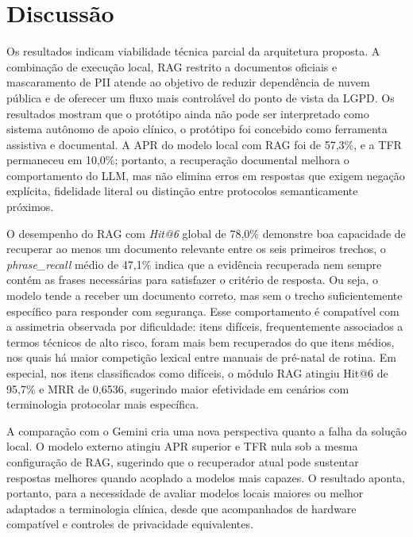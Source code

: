 \documentclass[12pt]{article}
\begin{document}
\section{Discussão}
Os resultados indicam viabilidade técnica parcial da arquitetura proposta.
A combinação de execução local, RAG restrito a documentos oficiais e mascaramento de PII atende ao objetivo de reduzir dependência de nuvem pública e de oferecer um fluxo mais controlável do ponto de vista da LGPD.
Os resultados mostram que o protótipo ainda não pode ser interpretado como sistema autônomo de apoio clínico, o protótipo foi concebido como ferramenta assistiva e documental.
A APR do modelo local com RAG foi de 57,3\%, e a TFR permaneceu em 10,0\%; portanto, a recuperação documental melhora o comportamento do LLM, mas não elimina erros em respostas que exigem negação explícita, fidelidade literal ou distinção entre protocolos semanticamente próximos.

O desempenho do RAG com \textit{Hit@6} global de 78,0\% demonstre boa capacidade de recuperar ao menos um documento relevante entre os seis primeiros trechos, o \textit{phrase\_recall} médio de 47,1\% indica que a evidência recuperada nem sempre contém as frases necessárias para satisfazer o critério de resposta.
Ou seja, o modelo tende a receber um documento correto, mas sem o trecho suficientemente específico para responder com segurança.
Esse comportamento é compatível com a assimetria observada por dificuldade: itens difíceis, frequentemente associados a termos técnicos de alto risco, foram mais bem recuperados do que itens médios, nos quais há maior competição lexical entre manuais de pré-natal de rotina.
Em especial, nos itens classificados como difíceis, o módulo RAG atingiu Hit@6 de 95,7\% e MRR de 0,6536, sugerindo maior efetividade em cenários com terminologia protocolar mais específica.

A comparação com o Gemini cria uma nova perspectiva quanto a falha da solução local.
O modelo externo atingiu APR superior e TFR nula sob a mesma configuração de RAG, sugerindo que o recuperador atual pode sustentar respostas melhores quando acoplado a modelos mais capazes.
O resultado aponta, portanto, para a necessidade de avaliar modelos locais maiores ou melhor adaptados a terminologia clínica, desde que acompanhados de hardware compatível e controles de privacidade equivalentes.
\end{document}
